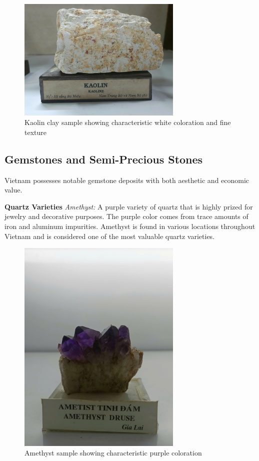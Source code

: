 \begin{figure}[H]
    \centering
    \includegraphics[width=0.7\textwidth]{graphics/kaolin_clay.png}
    \caption{Kaolin clay sample showing characteristic white coloration and fine texture}
    \label{fig:kaolin_clay}
\end{figure}

\subsection{Gemstones and Semi-Precious Stones}

Vietnam possesses notable gemstone deposits with both aesthetic and economic value.

\textbf{Quartz Varieties}
\textit{Amethyst:} A purple variety of quartz that is highly prized for jewelry and decorative purposes. The purple color comes from trace amounts of iron and aluminum impurities. Amethyst is found in various locations throughout Vietnam and is considered one of the most valuable quartz varieties.

\begin{figure}[H]
\centering
\includegraphics[width=0.7\textwidth]{graphics/amethyst.png}
\caption{Amethyst sample showing characteristic purple coloration}
\label{fig:amethyst}
\end{figure}

